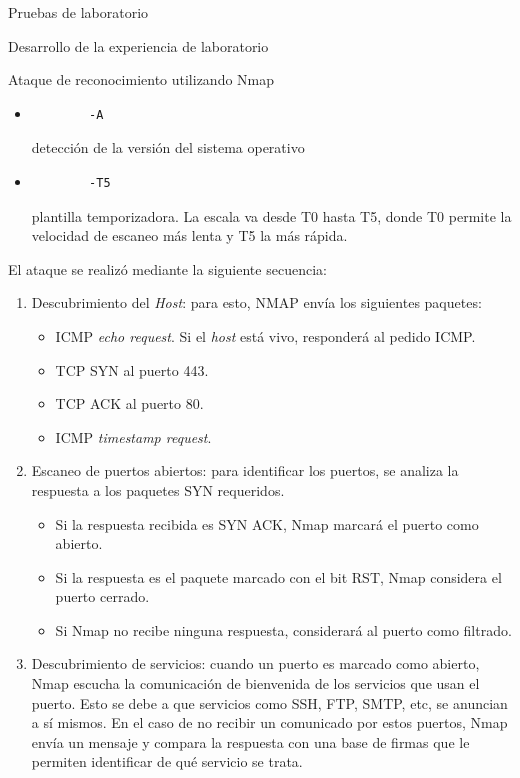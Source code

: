 \begin{section}{Pruebas de laboratorio}
\begin{subsection}{Desarrollo de la experiencia de laboratorio}
\begin{subsubsection}{Ataque de reconocimiento utilizando Nmap}
\begin{itemize}
        habilitar la detección del sistema operativo.
        \item \begin{verbatim}
        -A
        \end{verbatim}
        detección de la versión del sistema operativo
        \item \begin{verbatim}
        -T5
        \end{verbatim}
        plantilla temporizadora. La escala va desde T0 hasta T5, donde T0 permite la velocidad de escaneo más lenta y T5 la más rápida.
    \end{itemize}
    El ataque se realizó mediante la siguiente secuencia:
    \begin{enumerate}
        \item Descubrimiento del \textit{Host}: para esto, NMAP envía los siguientes paquetes:
        \begin{itemize}
            \item ICMP \textit{echo request}. Si el \textit{host} está vivo, responderá al pedido ICMP.
            \item TCP SYN al puerto 443.
            \item TCP ACK al puerto 80.
            \item ICMP \textit{timestamp request}.
        \end{itemize}
        \item Escaneo de puertos abiertos: para identificar los puertos, se analiza la respuesta a los paquetes SYN requeridos.
        \begin{itemize}
            \item Si la respuesta recibida es SYN ACK, Nmap marcará el puerto como abierto.
            \item Si la respuesta es el paquete marcado con el bit RST, Nmap considera el puerto cerrado.
            \item Si Nmap no recibe ninguna respuesta, considerará al puerto como filtrado.
        \end{itemize}
        \item Descubrimiento de servicios: cuando un puerto es marcado como abierto, Nmap escucha la comunicación de bienvenida de los servicios que usan el puerto. Esto se debe a que servicios como SSH, FTP, SMTP, etc, se anuncian a sí mismos. En el caso de no recibir un comunicado por estos puertos, Nmap envía un mensaje y compara la respuesta con una base de firmas que le permiten identificar de qué servicio se trata.

\end{enumerate}
\end{subsubsection}
\end{subsection}
\end{section}
